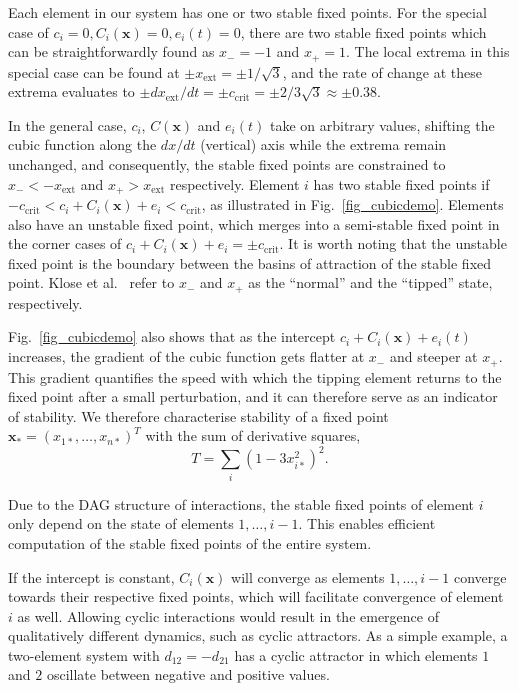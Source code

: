 \documentclass[conference]{IEEEtran}
\newcommand{\vectorsym}[1]{\ensuremath{\mathbf{#1}}}
\newcommand{\xextremum}{\ensuremath{x_{\mathrm{ext}}}}
\newcommand{\ccrit}{\ensuremath{c_{\mathrm{crit}}}}
\newcommand{\agentimpact}{\ensuremath{e}}
\newcommand{\couplingconstant}{\ensuremath{d}}
\newcommand{\couplingfunction}{\ensuremath{C}}
\newcommand{\sumderivsquares}{\ensuremath{T}}
\begin{document}
Each element in our system has one or two stable fixed points. For the
special case of
$c_i = 0, \couplingfunction_i(\vectorsym{x}) = 0, \agentimpact_i(t) = 0$, there are two
stable fixed points which can be straightforwardly found as
$x_{-} = -1$ and $x_{+} = 1$. The local extrema in this special case
can be found at $\pm \xextremum = \pm 1 / \sqrt{3}$, and the rate of
change at these extrema evaluates to
$\pm d\xextremum / dt = \pm \ccrit = \pm 2 / 3\sqrt{3} \approx \pm
0.38$.

In the general case, $c_i$, $C(\vectorsym{x})$ and $\agentimpact_i(t)$
take on arbitrary values, shifting the cubic function along the
$dx / dt$ (vertical) axis while the extrema remain unchanged, and consequently,
the stable fixed points are constrained to $x_{-} < -\xextremum$ and
$x_{+} > \xextremum$ respectively. Element $i$ has two stable fixed
points if
$-\ccrit < c_i + \couplingfunction_i(\vectorsym{x}) + \agentimpact_i <
\ccrit$,
as illustrated in Fig.~\ref{fig_cubicdemo}. Elements also have an
unstable fixed point, which merges into a semi-stable fixed point in
the corner cases of
$c_i + \couplingfunction_i(\vectorsym{x}) + \agentimpact_i = \pm
\ccrit$.
It is worth noting that the unstable fixed point is the boundary
between the basins of attraction of the stable fixed point. Klose et
al.\ \cite{Klose2019_interactingtippingelements} refer to $x_{-}$ and
$x_{+}$ as the ``normal'' and the ``tipped'' state, respectively.

Fig.~\ref{fig_cubicdemo} also shows that as the intercept
$c_i + \couplingfunction_i(\vectorsym{x}) + \agentimpact_i(t)$
increases, the gradient of the cubic function gets flatter at $x_{-}$
and steeper at $x_{+}$. This gradient quantifies the speed with which
the tipping element returns to the fixed point after a small
perturbation, and it can therefore serve as an indicator of stability.
We therefore characterise stability of a fixed point
$\vectorsym{x}_* = (x_{1*}, \ldots, x_{n*})^T$ with the sum of
derivative squares,
\begin{equation}
  \label{eq_dss}
  \sumderivsquares = \sum_i (1 - 3 x_{i*}^2)^2.
\end{equation}

Due to the DAG structure of interactions, the stable fixed points of
element $i$ only depend on the state of elements $1, \ldots, i - 1$.
This enables efficient computation of the stable fixed points of the
entire system.

If the intercept is constant, $\couplingfunction_i(\vectorsym{x})$
will converge as elements $1, \ldots, i - 1$ converge towards their
respective fixed points, which will facilitate convergence of element
$i$ as well. Allowing cyclic interactions would result in the
emergence of qualitatively different dynamics, such as cyclic
attractors. As a simple example, a two-element system with
$\couplingconstant_{12} = -\couplingconstant_{21}$ has a cyclic
attractor in which elements $1$ and $2$ oscillate between negative and
positive values.
\end{document}
